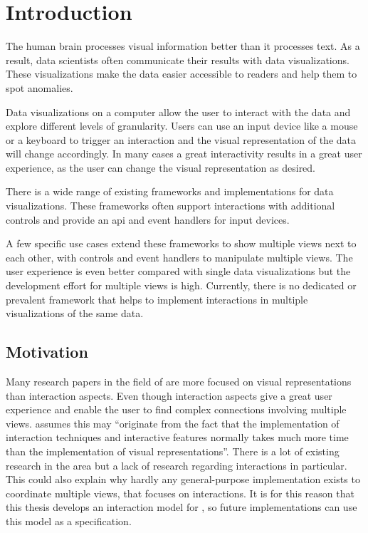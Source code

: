 \chapter{Introduction}
The human brain processes visual information better than it processes text.
As a result, data scientists often communicate their results with data visualizations.
These visualizations make the data easier accessible to readers and help them to spot anomalies.

Data visualizations on a computer allow the user to interact with the data and explore different levels of granularity.
Users can use an input device like a mouse or a keyboard to trigger an interaction and the visual representation of the data will change accordingly.
In many cases a great interactivity results in a great user experience, as the user can change the visual representation as desired.

There is a wide range of existing frameworks and implementations for data visualizations.
These frameworks often support interactions with additional controls and provide an \gls{api} and event handlers for input devices.

A few specific use cases extend these frameworks to show multiple views next to each other, with controls and event handlers to manipulate multiple views.
The user experience is even better compared with single data visualizations but the development effort for multiple views is high.
Currently, there is no dedicated or prevalent framework that helps to implement interactions in multiple visualizations of the same data.


\section{Motivation}\label{sec:outline}
Many research papers in the field of \cmvs{} are more focused on visual representations than interaction aspects.
Even though interaction aspects give a great user experience and enable the user to find complex connections involving multiple views.
\textcite{Ho2013} assumes this may ``originate from the fact that the implementation of interaction techniques and interactive features normally takes much more time than the implementation of visual representations''.
There is a lot of existing research in the area but a lack of research regarding interactions in particular.
This could also explain why hardly any general-purpose implementation exists to coordinate multiple views, that focuses on interactions.
It is for this reason that this thesis develops an interaction model for \cmvs{}, so future implementations can use this model as a specification.

